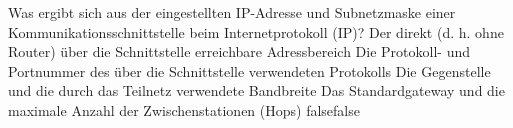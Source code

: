     {Was ergibt sich aus der eingestellten IP-Adresse und Subnetzmaske einer Kommunikationsschnittstelle beim Internetprotokoll (IP)?}
    {Der direkt (d. h. ohne Router) über die Schnittstelle erreichbare Adressbereich}
    {Die Protokoll- und Portnummer des über die Schnittstelle verwendeten Protokolls}
    {Die Gegenstelle und die durch das Teilnetz verwendete Bandbreite}
    {Das Standardgateway und die maximale Anzahl der Zwischenstationen (Hops)}
    {false}{false}